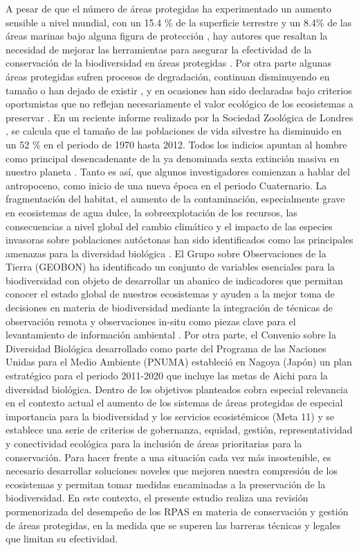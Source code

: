 \documentclass[11pt,]{article}
\begin{document}
A pesar de que el número de áreas protegidas ha experimentado un aumento
sensible a nivel mundial, con un 15.4 \% de la superficie terrestre y un
8.4\% de las áreas marinas bajo alguna figura de protección
\citep{juffe2014protected} , hay autores que resaltan la necesidad de
mejorar las herramientas para asegurar la efectividad de la conservación
de la biodiversidad en áreas protegidas \citep{Chape2005}. Por otra
parte algunas áreas protegidas sufren procesos de degradación, continuan
disminuyendo en tamaño o han dejado de existir \citep{Mascia2011}, y en
ocasiones han sido declaradas bajo criterios oportunistas que no
reflejan necesariamente el valor ecológico de los ecosistemas a
preservar \citep{Knight2007}. En un reciente informe realizado por la
Sociedad Zoológica de Londres \citep{Living2016} , se calcula que el
tamaño de las poblaciones de vida silvestre ha disminuido en un 52 \% en
el periodo de 1970 hasta 2012. Todos los indicios apuntan al hombre como
principal desencadenante de la ya denominada sexta extinción masiva en
nuestro planeta \citep{Barnosky2011}. Tanto es así, que algunos
investigadores comienzan a hablar del antropoceno, como inicio de una
nueva época en el periodo Cuaternario. La fragmentación del habitat, el
aumento de la contaminación, especialmente grave en ecosistemas de agua
dulce, la sobreexplotación de los recursos, las consecuencias a nivel
global del cambio climático y el impacto de las especies invasoras sobre
poblaciones autóctonas han sido identificados como las principales
amenazas para la diversidad biológica . El Grupo sobre Observaciones de
la Tierra (GEOBON) ha identificado un conjunto de variables esenciales
para la biodiversidad \citep{Pereira2013} con objeto de desarrollar un
abanico de indicadores que permitan conocer el estado global de nuestros
ecosistemas y ayuden a la mejor toma de decisiones en materia de
biodiversidad mediante la integración de técnicas de observación remota
y observaciones in-situ como piezas clave para el levantamiento de
información ambiental \citep{Forum2008}. Por otra parte, el Convenio
sobre la Diversidad Biológica desarrollado como parte del Programa de
las Naciones Unidas para el Medio Ambiente (PNUMA) estableció en Nagoya
(Japón) un plan estratégico para el periodo 2011-2020 que incluye las
metas de Aichi para la diversidad biológica. Dentro de los objetivos
planteados cobra especial relevancia en el contexto actual el aumento de
los sistemas de áreas protegidas de especial importancia para la
biodiversidad y los servicios ecosistémicos (Meta 11) y se establece una
serie de criterios de gobernanza, equidad, gestión, representatividad y
conectividad ecológica para la inclusión de áreas prioritarias para la
conservación. Para hacer frente a una situación cada vez más
insostenible, es necesario desarrollar soluciones noveles que mejoren
nuestra compresión de los ecosistemas y permitan tomar medidas
encaminadas a la preservación de la biodiversidad. En este contexto, el
presente estudio realiza una revisión pormenorizada del desempeño de los
RPAS en materia de conservación y gestión de áreas protegidas, en la
medida que se superen las barreras técnicas y legales que limitan su
efectividad.
\end{document}
